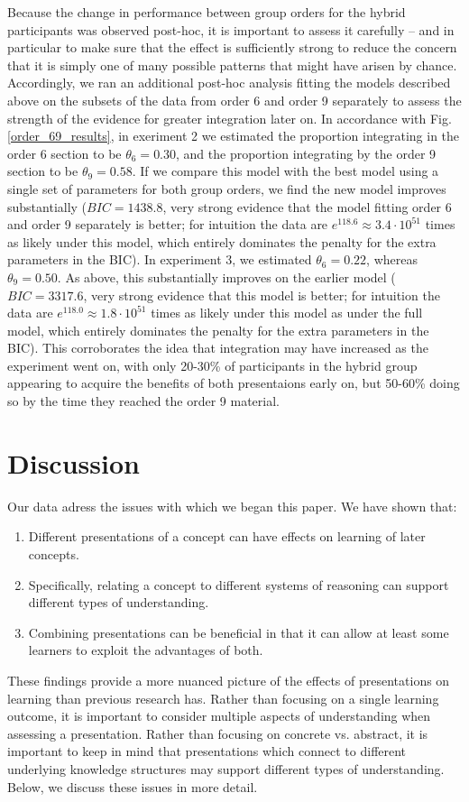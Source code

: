 \documentclass[man,10pt]{apa6}
\begin{document}
Because the change in performance between group orders for the hybrid participants was observed post-hoc, it is important to assess it carefully -- and in particular to make sure that the effect is sufficiently strong to reduce the concern that it is simply one of many possible patterns that might have arisen by chance. Accordingly, we ran an additional post-hoc analysis fitting the models described above on the subsets of the data from order 6 and order 9 separately to assess the strength of the evidence for greater integration later on. In accordance with Fig. \ref{order_69_results}, in exeriment 2 we estimated the proportion integrating in the order 6 section to be $\theta_6 = 0.30$, and the proportion integrating by the order 9 section to be $\theta_9 = 0.58$. If we compare this model with the best model using a single set of parameters for both group orders, we find the new model improves substantially ($BIC = 1438.8$, very strong evidence that the model fitting order 6 and order 9 separately is better; for intuition the data are $e^{118.6} \approx 3.4 \cdot 10^{51}$ times as likely under this model, which entirely dominates the penalty for the extra parameters in the BIC). In experiment 3, we estimated $\theta_6 = 0.22$, whereas $\theta_9 = 0.50$. As above, this substantially improves on the earlier model ($BIC=3317.6$, very strong evidence that this model is better; for intuition the data are $e^{118.0} \approx 1.8 \cdot 10^{51}$ times as likely under this model as under the full model, which entirely dominates the penalty for the extra parameters in the BIC). This corroborates the idea that integration may have increased as the experiment went on, with only 20-30\% of participants in the hybrid group appearing to acquire the benefits of both presentaions early on, but 50-60\% doing so by the time they reached the order 9 material.
\section{Discussion}
Our data adress the issues with which we began this paper. We have shown that:
\begin{enumerate}
\item Different presentations of a concept can have effects on learning of later concepts.
\item Specifically, relating a concept to different systems of reasoning can support different types of understanding.
\item Combining presentations can be beneficial in that it can allow at least some learners to exploit the advantages of both. 
\end{enumerate}
These findings provide a more nuanced picture of the effects of presentations on learning than previous research has. Rather than focusing on a single learning outcome, it is important to consider multiple aspects of understanding when assessing a presentation. Rather than focusing on concrete vs. abstract, it is important to keep in mind that presentations which connect to different underlying knowledge structures may support different types of understanding. Below, we discuss these issues in more detail.\par
\end{document}
